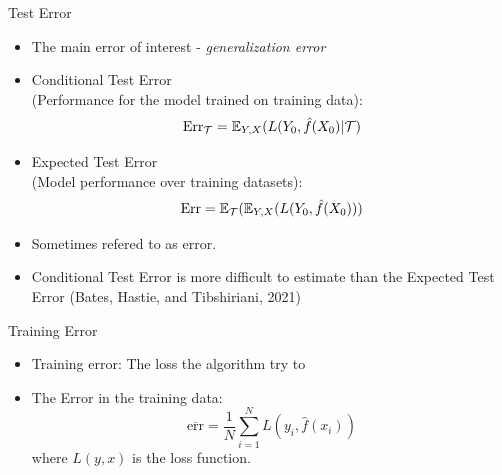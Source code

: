 \documentclass[10pt]{beamer}
\begin{document}
\begin{frame}{Test Error}

\begin{itemize}
\item The main error of interest - \emph{generalization error}
\item Conditional Test Error \\(Performance for the model trained on  training data):
\[
\text{Err}_\mathcal{T} = \operatorname{\mathbb{E}}_{Y,X}(L(Y_0,\hat{f}(X_0) | \mathcal{T})
\]
\item Expected Test Error \\(Model performance over  training datasets):
\[
\text{Err} = \operatorname{\mathbb{E}}_\mathcal{T}(\operatorname{\mathbb{E}}_{Y,X}(L(Y_0,\hat{f}(X_0)))
\]
\item Sometimes refered to as  error.
\item Conditional Test Error is more difficult to estimate than the Expected Test Error (Bates, Hastie, and Tibshiriani, 2021)
\end{itemize}

\end{frame}


\begin{frame}{Training Error}

\begin{itemize}
\item Training error: The loss the algorithm try to 
\item The Error in the training data:
\[
\overline{\text{err}} = \frac{1}{N} \sum_{i=1}^N L(y_i,\hat{f}(x_i))
\]
where $L(y,x)$ is the loss function.

\end{itemize}

\end{frame}
\end{document}
